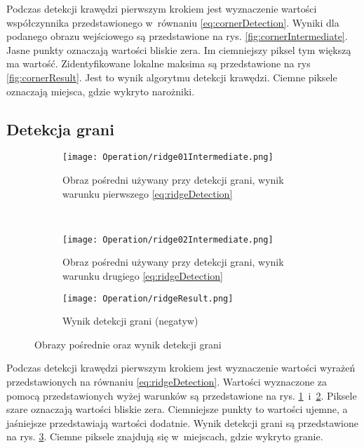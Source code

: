 Podczas detekcji krawędzi pierwszym krokiem jest wyznaczenie wartości współczynnika przedstawionego w~równaniu \eqref{eq:cornerDetection}. Wyniki dla podanego obrazu wejściowego są przedstawione na rys. \ref{fig:cornerIntermediate}. Jasne punkty oznaczają wartości bliskie zera. Im ciemniejszy piksel tym większą ma wartość. Zidentyfikowane lokalne maksima są przedstawione na rys \ref{fig:cornerResult}. Jest to wynik algorytmu detekcji krawędzi. Ciemne piksele oznaczają miejsca, gdzie wykryto narożniki.

\subsection{Detekcja grani}
\label{sec:dzialanieRidge}

\begin{figure}[h]
\begin{center}

\begin{subfigure}[t]{0.3\textwidth}
\texttt{[image: Operation/ridge01Intermediate.png]}
\caption{Obraz pośredni używany przy detekcji grani, wynik warunku pierwszego \eqref{eq:ridgeDetection}}
\label{fig:ridgeIntermediate1}
\end{subfigure}
~
\begin{subfigure}[t]{0.3\textwidth}
\texttt{[image: Operation/ridge02Intermediate.png]}
\caption{Obraz pośredni używany przy detekcji grani, wynik warunku drugiego \eqref{eq:ridgeDetection}}
\label{fig:ridgeIntermediate2}
\end{subfigure}

\begin{subfigure}[t]{0.3\textwidth}
\texttt{[image: Operation/ridgeResult.png]}
\caption{Wynik detekcji grani (negatyw)}
\label{fig:ridgeResult}
\end{subfigure}

\end{center}
\label{fig:showEdge}
\caption{Obrazy pośrednie oraz wynik detekcji grani}
\end{figure}

Podczas detekcji krawędzi pierwszym krokiem jest wyznaczenie wartości wyrażeń przedstawionych na równaniu \eqref{eq:ridgeDetection}. Wartości wyznaczone za pomocą przedstawionych wyżej warunków są przedstawione na rys. \ref{fig:ridgeIntermediate1}~i~\ref{fig:ridgeIntermediate2}. Piksele szare oznaczają wartości bliskie zera. Ciemniejsze punkty to wartości ujemne, a jaśniejsze przedstawiają wartości dodatnie. Wynik detekcji grani są przedstawione na rys. \ref{fig:ridgeResult}. Ciemne piksele znajdują się w~miejscach, gdzie wykryto granie.
